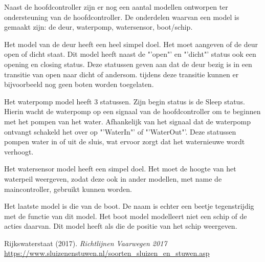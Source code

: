 \documentclass{article}
\begin{document}
Naast de hoofdcontroller zijn er nog een aantal modellen ontworpen ter ondersteuning van de hoofdcontroller. De onderdelen waarvan een model is gemaakt zijn: de deur, waterpomp, watersensor, boot/schip.


\vskip0.5cm

Het model van de deur heeft een heel simpel doel. Het moet aangeven of de deur open of dicht staat. Dit model heeft naast de "'open"' en "'dicht"' status ook een opening en closing status. Deze statussen geven aan dat de deur bezig is in een transitie van open naar dicht of andersom. tijdens deze transitie kunnen er bijvoorbeeld nog geen boten worden toegelaten.

\vskip0.5cm

Het waterpomp model heeft 3 statussen. Zijn begin status is de Sleep status. Hierin wacht de waterpomp op een signaal van de hoofdcontroller om te beginnen met het pompen van het water. Afhankelijk van het signaal dat de waterpomp ontvangt schakeld het over op "'WaterIn"' of "'WaterOut"'. Deze statussen pompen water in of uit de sluis, wat ervoor zorgt dat het waternieuwe wordt verhoogt.

Het watersensor model heeft een simpel doel. Het moet de hoogte van het waterpeil weergeven, zodat deze ook in ander modellen, met name de maincontroller, gebruikt kunnen worden.

Het laatste model is die van de boot. De naam is echter een beetje tegenstrijdig met de functie van dit model. Het boot model modelleert niet een schip of de acties daarvan. Dit model heeft als die de positie van het schip weergeven.



\clearpage %

\clearpage %
\begin{thebibliography}{9}
Rijkswaterstaat (2017).
\textit{Richtlijnen Vaarwegen 2017}\\

\url{https://www.sluizenenstuwen.nl/soorten_sluizen_en_stuwen.asp}


\end{thebibliography}
\end{document}
